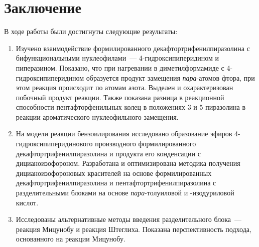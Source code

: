 \section{Заключение}
В ходе работы были достигнуты следующие результаты:
\begin{enumerate}
    \item Изучено взаимодействие формилированного декафтортрифенилпиразолина с бифункциональными нуклеофилами~--- \mbox{4-гидроксипиперидином} и пиперазином. Показано, что при нагревании в диметилформамиде с \mbox{4-гидроксипиперидином} образуется продукт замещения \emph{пара}-атомов фтора, при этом реакция происходит по атомам азота. Выделен и охарактеризован побочный продукт реакции. Также показана разница в реакционной способности пентафторфенильных колец в положениях 3 и 5 пиразолина в реакции ароматического нуклеофильного замещения.
    \item На модели реакции бензоилирования исследовано образование эфиров \mbox{4-гидроксипиперидинового} производного формилированного декафтортрифенилпиразолина и продукта его конденсации с дицианоизофороном. Разработана и оптимизирована методика получения дицианоизофороновых красителей на основе формилированных декафтортрифенилпиразолина и пентафтортрифенилпиразолина с разделительными блоками на основе \emph{пара}-толуиловой и \chembeta-изодуриловой кислот.
    \item Исследованы альтернативные методы введения разделительного блока~--- реакция Мицунобу и реакция Штеглиха. Показана перспективность подхода, основанного на реакции Мицунобу.
\end{enumerate}


